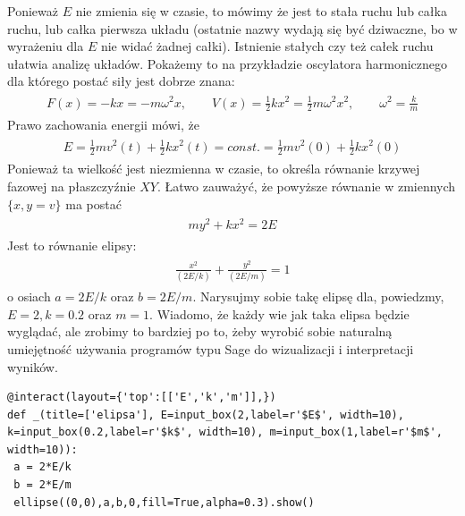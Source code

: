 \documentclass[a4paper,12pt,polish]{sphinxmanual}
\begin{document}
Ponieważ $E$ nie zmienia się w czasie, to mówimy że jest to stała ruchu lub całka ruchu, lub całka pierwsza układu (ostatnie nazwy wydają  się być dziwaczne, bo w wyrażeniu dla $E$ nie widać żadnej całki).  Istnienie stałych czy też całek ruchu ułatwia analizę układów. Pokażemy to na przykładzie oscylatora harmonicznego  dla którego postać siły jest dobrze znana:
\label{ch1/chI022:equation-eqn6}\begin{gather}
\begin{split}F(x) = - k x = - m\omega^2 x, \qquad V(x) = \frac{1}{2} k  x^2  = \frac{1}{2} m\omega^2 x^2, \quad \quad \omega^2 = \frac{k}{m}\end{split}\label{ch1/chI022-eqn6}
\end{gather}
Prawo zachowania energii mówi, że
\label{ch1/chI022:equation-eqn7}\begin{gather}
\begin{split}E = \frac{1}{2} m v^2(t) + \frac{1}{2} k x^2(t) = const. = \frac{1}{2} m v^2(0) + \frac{1}{2} k x^2(0)\end{split}\label{ch1/chI022-eqn7}
\end{gather}
Ponieważ ta wielkość jest niezmienna w czasie, to określa równanie krzywej fazowej na płaszczyźnie $XY$. Łatwo zauważyć, że powyższe równanie w zmiennych $\{x, y=v\}$ ma postać
\label{ch1/chI022:equation-eqn8}\begin{gather}
\begin{split} m y^2 +  k x^2 =  2E\end{split}\label{ch1/chI022-eqn8}
\end{gather}
Jest to równanie elipsy:
\label{ch1/chI022:equation-eqn9}\begin{gather}
\begin{split}\frac{x^2}{(2E/k)} + \frac{y^2}{(2E/m)} = 1\end{split}\label{ch1/chI022-eqn9}
\end{gather}
o osiach $a=2E/k$ oraz $b=2E/m$. Narysujmy sobie takę elipsę dla, powiedzmy, $E = 2, k = 0.2$ oraz $m=1$. Wiadomo, że każdy wie jak taka elipsa będzie wyglądać, ale zrobimy to bardziej po to, żeby wyrobić sobie naturalną umiejętność używania programów typu Sage do wizualizacji i interpretacji wyników.


\begin{verbatim}
@interact(layout={'top':[['E','k','m']],})
def _(title=['elipsa'], E=input_box(2,label=r'$E$', width=10), k=input_box(0.2,label=r'$k$', width=10), m=input_box(1,label=r'$m$', width=10)):
 a = 2*E/k
 b = 2*E/m
 ellipse((0,0),a,b,0,fill=True,alpha=0.3).show()
\end{verbatim}
\end{document}
